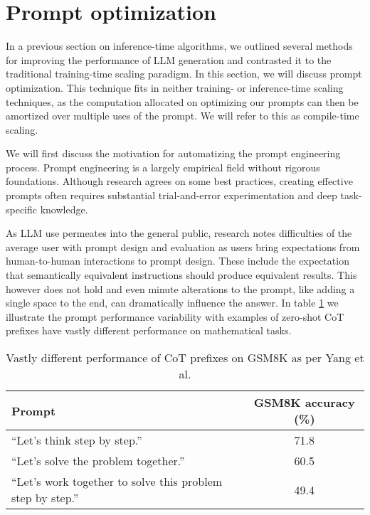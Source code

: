 \section{Prompt optimization}
In a previous section on inference-time algorithms, we outlined several methods for improving the performance of LLM generation
and contrasted it to the traditional training-time scaling paradigm. In this section, we will discuss prompt optimization. 
This technique fits in neither training- or inference-time scaling techniques, as the computation allocated on
optimizing our prompts can then be amortized over multiple uses of the prompt. 
We will refer to this as compile-time\cite{schnabel2024symbolicpromptprogramsearch} scaling.

We will first discuss the motivation for automatizing the prompt engineering process. 
Prompt engineering is a largely empirical field without rigorous foundations.
Although research agrees on some best practices, creating effective prompts 
often requires substantial trial-and-error experimentation and deep task-specific 
knowledge\cite{xiang2025selfsupervisedpromptoptimization}.

As LLM use permeates into the general public, research\cite{10.1145/3544548.3581388} notes difficulties 
of the average user with prompt design and evaluation as users bring expectations from human-to-human 
interactions to prompt design. These include the expectation that semantically equivalent instructions 
should produce equivalent results. This however does not hold and even minute
alterations to the prompt, like adding a single space to the end, can dramatically influence the answer\cite{zhuo2024prosaassessingunderstandingprompt}\cite{salinas2024butterflyeffectalteringprompts}.
In table \ref{tab:cotprefixperf} we illustrate the prompt performance variability with examples of zero-shot CoT\cite{NEURIPS2022_8bb0d291} prefixes have vastly different performance on mathematical tasks.

\begin{table}[htbp]
    \centering
    \caption{Vastly different performance of CoT prefixes on GSM8K as per Yang et al.\cite{yang2024largelanguagemodelsoptimizers}}
    \label{tab:cotprefixperf}
    \begin{tabularx}{\linewidth}{Xc}
    \toprule
    \textbf{Prompt} & \textbf{GSM8K accuracy (\%)} \\
    \midrule
    ``Let's think step by step.'' & 71.8 \\
    ``Let's solve the problem together.'' & 60.5 \\
    ``Let's work together to solve this problem step by step.'' & 49.4 \\
    \bottomrule
    \end{tabularx}
\end{table}

